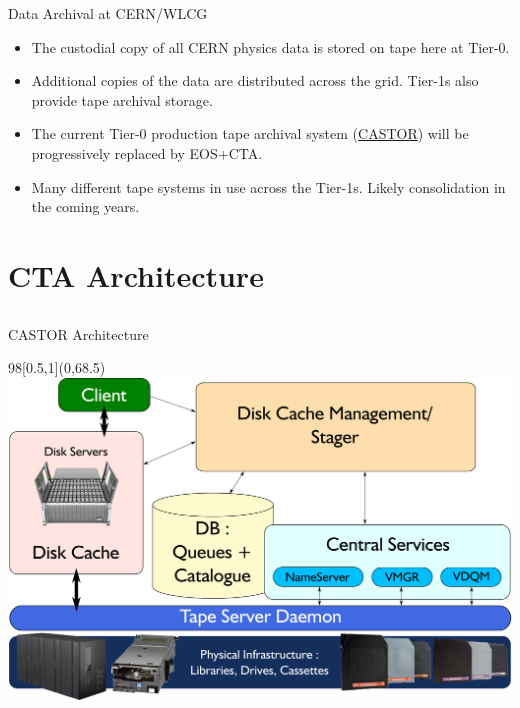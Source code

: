 \documentclass{beamer}
\begin{document}
\begin{frame}{Data Archival at CERN/WLCG}
\begin{itemize}
   \item The custodial copy of all CERN physics data is stored on tape here at Tier-0.
   \item Additional copies of the data are distributed across the grid. Tier-1s also provide tape archival storage.
   \item The current Tier-0 production tape archival system (\href{http://castor.web.cern.ch/}{\color{cern@blue}CASTOR}) will be progressively replaced by EOS+CTA.
   \item Many different tape systems in use across the Tier-1s. Likely consolidation in the coming years.
\end{itemize}
\end{frame}

\section{CTA Architecture}
\subsection{}

\begin{frame}{CASTOR Architecture}
\begin{textblock}{98}[0.5,1](0,68.5) %
   \includegraphics[width=\textwidth]{images/CASTOR_Arch}
\end{textblock}
\end{frame}
\end{document}
